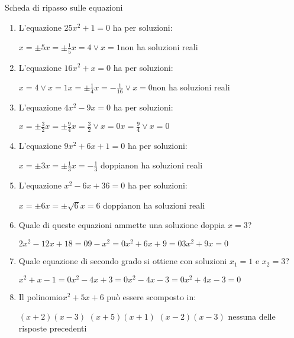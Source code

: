 \begin{esercizio}[\Ast]
 \label{ese:3.159}
 Scheda di ripasso sulle equazioni
\begin{enumerate}
	\item L'equazione $25x^{2} + 1 = 0$ ha per soluzioni:

\boxA\quad $ x = \pm 5 $\qquad \boxB\quad $x = \pm \frac{1}{5}$\qquad\boxC\quad $x = 4 \vee x = 1$\qquad\boxD\quad non ha soluzioni reali

	\item L'equazione $16x^{2} + x = 0$ ha per soluzioni:

\boxA\quad $ x = 4 \vee x = 1 $\quad \boxB\quad $x = \pm \frac{1}{4}$\quad\boxC\quad $x =-\frac{1}{16} \vee x = 0$\quad\boxD\quad non ha soluzioni reali

	\item L'equazione $4x^{2}-9x = 0$ ha per soluzioni:

\boxA\quad $ x = \pm \frac{3}{2} $\qquad \boxB\quad $x = \pm \frac{9}{4}$\qquad\boxC\quad $x = \frac{3}{2} \vee x = 0$\qquad\boxD\quad $x = \frac{9}{4} \vee x = 0$

	\item L'equazione $9x^{2} + 6x + 1 = 0$ ha per soluzioni:

\boxA\quad $x = \pm 3$\qquad\boxB\quad $x = \pm \frac{1}{3}$\qquad\boxC\quad $x =-\frac{1}{3}$ doppia\qquad\boxD\quad non ha soluzioni reali

	\item L'equazione $x^{2}-6x + 36 = 0$ ha per soluzioni:

\boxA\quad $x = \pm 6$\qquad\boxB\quad $x = \pm \sqrt{6}$\qquad\boxC\quad $x =6$ doppia\qquad\boxD\quad non ha soluzioni reali

	\item Quale di queste equazioni ammette una soluzione doppia $ x=3 $?

\boxA\quad $2x^{2}-12x + 18 = 0$\quad\boxB\quad $9-x^{2} = 0$\quad\boxC\quad $x^{2} + 6x + 9 = 0$\quad\boxD\quad $ 3x^{2} + 9x = 0 $

	\item Quale equazione di secondo grado si ottiene con soluzioni $ x_1=1 $ e $ x_2=3 $?

\boxA\quad $x^{2} + x-1 = 0$\quad\boxB\quad $x^{2}-4x + 3 = 0$\quad\boxC\quad $x^{2}-4x-3 = 0$\quad\boxD\quad $ x^{2} + 4x-3 = 0 $

	\item Il polinomio$x^{2} + 5x + 6$ può essere scomposto in:

\boxA\; $(x + 2) (x-3)$\quad\boxB\; $(x + 5) (x + 1)$\quad\boxC\; $(x-2) (x-3)$\quad\boxD\; nessuna delle risposte precedenti


\end{enumerate}
\end{esercizio}
